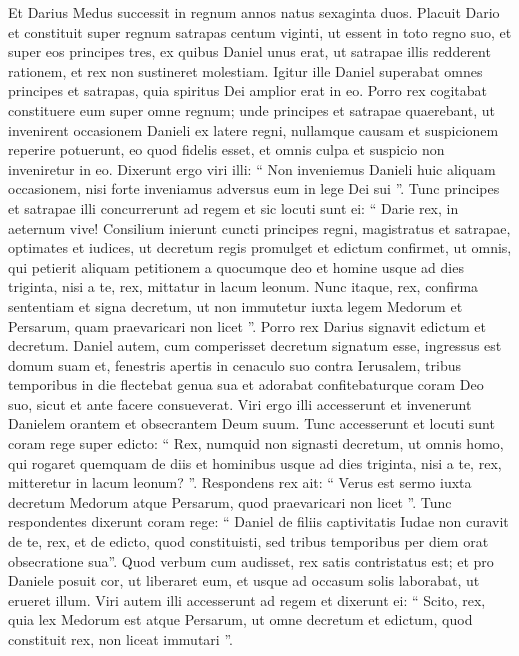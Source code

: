\begin{biblechapter}
\begin{biblechapter}
\begin{biblechapter}
\begin{biblechapter}
\begin{biblechapter}
\begin{biblechapter}
\verse Et Darius Medus successit in regnum annos natus sexaginta duos. 
\verse Placuit Dario et constituit super regnum satrapas centum viginti, ut essent in toto regno suo, 
\verse et super eos principes tres, ex quibus Daniel unus erat, ut satrapae illis redderent rationem, et rex non sustineret molestiam. 
\verse Igitur ille Daniel superabat omnes principes et satrapas, quia spiritus Dei amplior erat in eo. Porro rex cogitabat constituere eum super omne regnum; 
\verse unde principes et satrapae quaerebant, ut invenirent occasionem Danieli ex latere regni, nullamque causam et suspicionem reperire potuerunt, eo quod fidelis esset, et omnis culpa et suspicio non inveniretur in eo. 
\verse Dixerunt ergo viri illi: “ Non inveniemus Danieli huic aliquam occasionem, nisi forte inveniamus adversus eum in lege Dei sui ”. 
\verse Tunc principes et satrapae illi concurrerunt ad regem et sic locuti sunt ei: “ Darie rex, in aeternum vive! 
 \verse Consilium inierunt cuncti principes regni, magistratus et satrapae, optimates et iudices, ut decretum regis promulget et edictum confirmet, ut omnis, qui petierit aliquam petitionem a quocumque deo et homine usque ad dies triginta, nisi a te, rex, mittatur in lacum leonum. 
\verse Nunc itaque, rex, confirma sententiam et signa decretum, ut non immutetur iuxta legem Medorum et Persarum, quam praevaricari non licet ”. 
\verse Porro rex Darius signavit edictum et decretum.
 \verse Daniel autem, cum comperisset decretum signatum esse, ingressus est domum suam et, fenestris apertis in cenaculo suo contra Ierusalem, tribus temporibus in die flectebat genua sua et adorabat confitebaturque coram Deo suo, sicut et ante facere consueverat. 
\verse Viri ergo illi accesserunt et invenerunt Danielem orantem et obsecrantem Deum suum. 
\verse Tunc accesserunt et locuti sunt coram rege super edicto: “ Rex, numquid non signasti decretum, ut omnis homo, qui rogaret quemquam de diis et hominibus usque ad dies triginta, nisi a te, rex, mitteretur in lacum leonum? ”. Respondens rex ait: “ Verus est sermo iuxta decretum Medorum atque Persarum, quod praevaricari non licet ”. 
\verse Tunc respondentes dixerunt coram rege: “ Daniel de filiis captivitatis Iudae non curavit de te, rex, et de edicto, quod constituisti, sed tribus temporibus per diem orat obsecratione sua”. 
\verse Quod verbum cum audisset, rex satis contristatus est; et pro Daniele posuit cor, ut liberaret eum, et usque ad occasum solis laborabat, ut erueret illum. 
\verse Viri autem illi accesserunt ad regem et dixerunt ei: “ Scito, rex, quia lex Medorum est atque Persarum, ut omne decretum et edictum, quod constituit rex, non liceat immutari ”.

\end{biblechapter}
\end{biblechapter}
\end{biblechapter}
\end{biblechapter}
\end{biblechapter}
\end{biblechapter}
